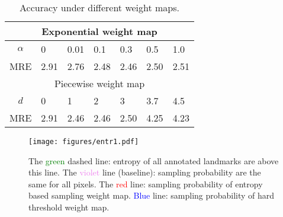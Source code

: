 \documentclass[10pt,twocolumn,letterpaper]{article}
\begin{document}



\begin{table}[]
    \centering
    \begin{tabular}{c|l|l|l|l|l|l}
    \multicolumn{7}{c}{Exponential weight map} \\
    \hline
        $\alpha$   &  0   & 0.01 & 0.1 & 0.3   & 0.5 & 1.0 \\
        \hline
        MRE & 2.91 & 2.76 & 2.48 & 2.46 & 2.50 & 2.51 \\
        \hline
        \multicolumn{7}{c}{Piecewise weight map} \\
        \hline
        $d$ & 0  & 1    &  2  & 3   &  3.7 & 4.5 \\
        \hline
        MRE & 2.91 & 2.46 & 2.46 & 2.50 & 4.25 & 4.23 \\
    \hline
    \end{tabular}
    \caption{Accuracy under different weight maps.}
    \label{table:reduce_noise}
\end{table}

\begin{figure}
    \centering
    \texttt{[image: figures/entr1.pdf]}
    \caption{The \textcolor{green}{green} dashed line: entropy of all annotated landmarks are above this line. The \textcolor{violet}{violet} line (baseline): sampling probability are the same for all pixels. The \textcolor{red}{red} line: sampling probability of entropy based sampling weight map. \textcolor{blue}{Blue} line: sampling probability of hard threshold weight map.}
    \label{fig:entr1}
\end{figure}
\end{document}
